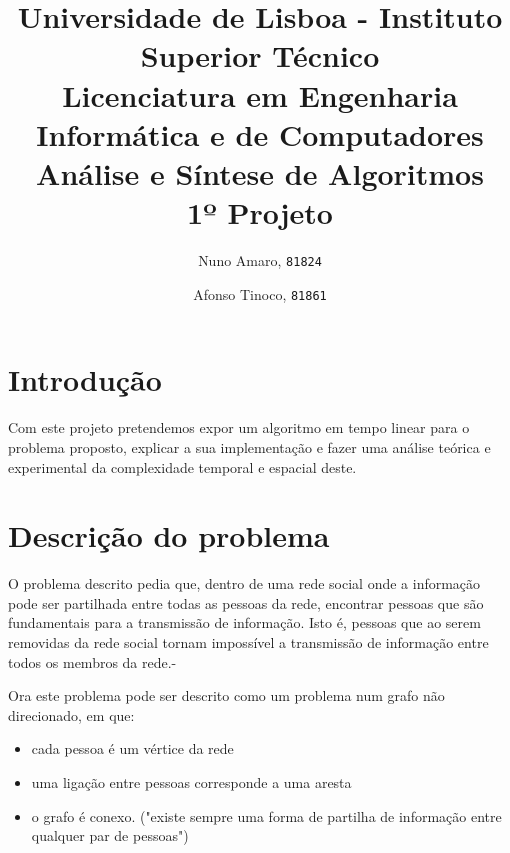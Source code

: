 \documentclass{scrartcl}
\begin{document}

\title{
	\textnormal{
	\LARGE Universidade de Lisboa - Instituto Superior Técnico\\
	\Large Licenciatura em Engenharia Informática e de Computadores\\
	\Large Análise e Síntese de Algoritmos
\\}
	\LARGE1º Projeto
	\vspace{-1ex}
	}
\author{Nuno Amaro,
	\texttt{81824}
	\and
	Afonso Tinoco,
	\texttt{81861}
}
\date{	\vspace{-1ex}
		\vspace{-4ex}	
	}
\maketitle
\section*{Introdução}
Com este projeto pretendemos expor um algoritmo em tempo linear para o problema proposto, explicar a sua implementação e fazer uma análise teórica e experimental da complexidade temporal e espacial deste.

\section*{Descrição do problema}
O problema descrito pedia que, dentro de uma rede social onde a informação pode ser partilhada entre todas as pessoas da rede, encontrar pessoas que são fundamentais para a transmissão de informação. Isto é, pessoas que ao serem removidas da rede social tornam impossível a transmissão de informação entre todos os membros da rede.-

Ora este problema pode ser descrito como um problema num grafo não direcionado, em que:
\begin{itemize}
\setlength\itemsep{-0.5ex}
\item cada pessoa é um vértice da rede 
\item uma ligação entre pessoas corresponde a uma aresta 
\item o grafo é conexo. ("existe sempre uma forma de partilha de informação entre qualquer par de pessoas")
\end{itemize}
\end{document}
